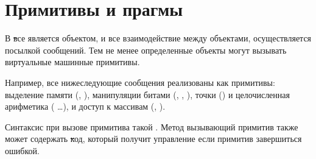\documentclass[a4paper,10pt,twoside]{book}
\begin{document}
\section{Примитивы и прагмы}


В \st все является объектом, и все взаимодействие между объектами, осуществляется посылкой сообщений.
Тем не менее определенные объекты могут вызывать виртуальные машинные примитивы.


Например, все нижеследующие сообщения реализованы как примитивы:
выделение памяти (, ),
манипуляции битами (, , ),
точки () и целочисленная арифметика (\ct{+} \ct{-} \ct{<} \ct{>} \ct{*} \ct{/} \ct{=} \ct{==} …),
и доступ к массивам (, ).


Синтаксис при вызове примитива такой .
Метод вызывающий примитив также может содержать \st код, который получит управление если примитив завершиться ошибкой.

\end{document}
